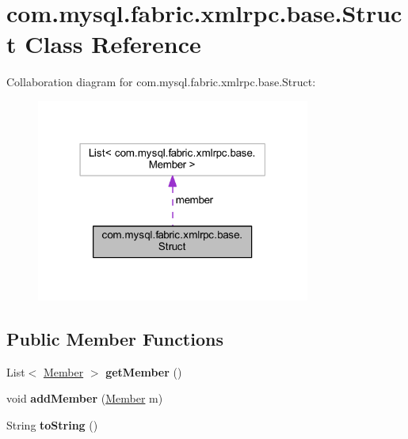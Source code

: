 \hypertarget{classcom_1_1mysql_1_1fabric_1_1xmlrpc_1_1base_1_1_struct}{}\section{com.\+mysql.\+fabric.\+xmlrpc.\+base.\+Struct Class Reference}
\label{classcom_1_1mysql_1_1fabric_1_1xmlrpc_1_1base_1_1_struct}


Collaboration diagram for com.\+mysql.\+fabric.\+xmlrpc.\+base.\+Struct\+:\nopagebreak
\begin{figure}[H]
\begin{center}
\leavevmode
\includegraphics[width=255pt]{classcom_1_1mysql_1_1fabric_1_1xmlrpc_1_1base_1_1_struct__coll__graph}
\end{center}
\end{figure}
\subsection*{Public Member Functions}
\begin{DoxyCompactItemize}
\item 
\mbox{\label{classcom_1_1mysql_1_1fabric_1_1xmlrpc_1_1base_1_1_struct_a10815155bed71fefab13b6010ff31dd1}} 
List$<$ \mbox{\hyperlink{classcom_1_1mysql_1_1fabric_1_1xmlrpc_1_1base_1_1_member}{Member}} $>$ {\bfseries get\+Member} ()
\item 
\mbox{\label{classcom_1_1mysql_1_1fabric_1_1xmlrpc_1_1base_1_1_struct_a1bc3eef9982454702f66d31333950aff}} 
void {\bfseries add\+Member} (\mbox{\hyperlink{classcom_1_1mysql_1_1fabric_1_1xmlrpc_1_1base_1_1_member}{Member}} m)
\item 
\mbox{\label{classcom_1_1mysql_1_1fabric_1_1xmlrpc_1_1base_1_1_struct_a39e734e8ec2cbb8bdefb396d70f6c9e1}} 
String {\bfseries to\+String} ()
\end{DoxyCompactItemize}
